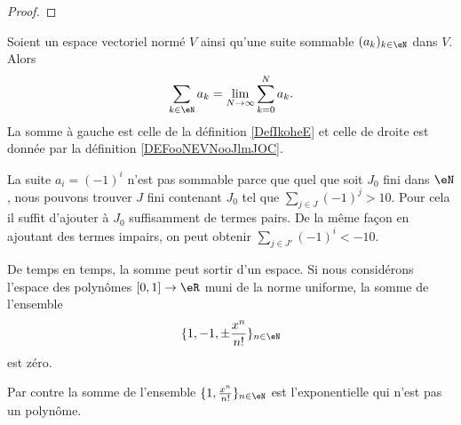 \begin{proof}
\end{proof}

\begin{lemma}       \label{LEMooGXPGooZTJPoN}
    Soient un espace vectoriel normé \( V\) ainsi qu'une suite sommable \( (a_k)_{k\in \eN}\) dans \( V\). Alors
	\begin{equation}
		\sum_{k\in \eN}a_k=\lim_{N\to \infty} \sum_{k=0}^N a_k.
	\end{equation}
	La somme à gauche est celle de la définition \ref{DefIkoheE} et celle de droite est donnée par la définition \ref{DEFooNEVNooJlmJOC}.
\end{lemma}

\begin{example}
	La suite \( a_i=(-1)^i\) n'est pas sommable parce que quel que soit \( J_0\) fini dans \( \eN\), nous pouvons trouver \( J\) fini contenant \( J_0\) tel que \( \sum_{j\in J}(-1)^j>10\). Pour cela il suffit d'ajouter à \( J_0\) suffisamment de termes pairs. De la même façon en ajoutant des termes impairs, on peut obtenir \( \sum_{j\in J'}(-1)^i<-10\).
\end{example}

\begin{example}
	De temps en temps, la somme peut sortir d'un espace. Si nous considérons l'espace des polynômes \( \mathopen[ 0 , 1 \mathclose]\to \eR\) muni de la norme uniforme, la somme de l'ensemble
	\begin{equation}
		\{ 1,-1,\pm\frac{ x^n }{ n! } \}_{n\in \eN}
	\end{equation}
	est zéro.

	Par contre la somme de l'ensemble \( \{ 1,\frac{ x^n }{ n! } \}_{n\in \eN}\) est l'exponentielle qui n'est pas un polynôme.
\end{example}

